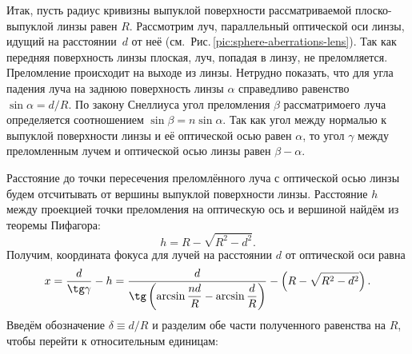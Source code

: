 Итак, пусть радиус кривизны выпуклой поверхности рассматриваемой плос\-ко-вы\-пук\-лой линзы равен $R$. Рассмотрим луч, параллельный оптической оси линзы, идущий на расстоянии~$d$ от неё (см.~Рис.\,\ref{pic:sphere-aberrations-lens}). Так как передняя поверхность линзы плоская, луч, попадая в линзу, не преломляется. Преломление происходит на выходе из линзы. Нетрудно показать, что для угла падения луча на заднюю поверхность линзы $\alpha$ справедливо равенство $\sin \alpha = d/R$. По закону Снеллиуса угол преломления $\beta$ рассматримоего луча  определяется соотношением $\sin \beta = n \sin \alpha$. Так как угол между нормалью к выпуклой поверхности линзы и её оптической осью равен $\alpha$, то угол $\gamma$ между преломленным лучем и оптической осью линзы равен $\beta - \alpha$.

Расстояние до точки пересечения преломлённого луча с оптической осью линзы будем отсчитывать от вершины выпуклой поверхности линзы. Расстояние $h$ между проекцией точки преломления на оптическую ось и вершиной найдём из теоремы Пифагора:
\begin{equation*}
    h = R - \sqrt{R^2 - d^2}.
\end{equation*}
Получим, координата фокуса для лучей на расстоянии $d$ от оптической оси равна
\begin{equation}
    x = \frac{d}{\tg \gamma} - h = \frac{d}{\tg \left( \arcsin \dfrac{n d}{R} - \arcsin \dfrac{d}{R} \right)} - \left( R - \sqrt{R^2 - d^2} \right).
    \label{eq:optics-aberr-x(d)}
\end{equation}
Введём обозначение $\delta \equiv d/R$ и разделим обе части полученного равенства на $R$, чтобы перейти к относительным единицам:
